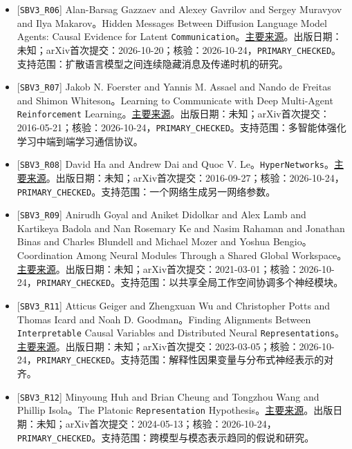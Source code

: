 \documentclass[
  10pt,
]{article}
\begin{document}
\begin{itemize}
\item
  {[}\nolinkurl{SBV3_R06}{]} Alan-Barsag Gazzaev and Alexey Gavrilov and
  Sergey Muravyov and Ilya Makarov。Hidden Messages Between Diffusion
  Language Model Agents: Causal Evidence for Latent
  \nolinkurl{Communication}。\href{https://arxiv.org/abs/2610.28905}{主要来源}。出版日期：未知；arXiv首次提交：2026-10-20；核验：2026-10-24，\nolinkurl{PRIMARY_CHECKED}。支持范围：扩散语言模型之间连续隐藏消息及传递时机的研究。
\item
  {[}\nolinkurl{SBV3_R07}{]} Jakob N. Foerster and Yannis M. Assael and
  Nando de Freitas and Shimon Whiteson。Learning to Communicate with
  Deep Multi-Agent \nolinkurl{Reinforcement}
  Learning。\href{https://arxiv.org/abs/1605.06676}{主要来源}。出版日期：未知；arXiv首次提交：2016-05-21；核验：2026-10-24，\nolinkurl{PRIMARY_CHECKED}。支持范围：多智能体强化学习中端到端学习通信协议。
\item
  {[}\nolinkurl{SBV3_R08}{]} David Ha and Andrew Dai and Quoc V.
  Le。\nolinkurl{HyperNetworks}。\href{https://arxiv.org/abs/1609.09106}{主要来源}。出版日期：未知；arXiv首次提交：2016-09-27；核验：2026-10-24，\nolinkurl{PRIMARY_CHECKED}。支持范围：一个网络生成另一网络参数。
\item
  {[}\nolinkurl{SBV3_R09}{]} Anirudh Goyal and Aniket Didolkar and Alex
  Lamb and Kartikeya Badola and Nan Rosemary Ke and Nasim Rahaman and
  Jonathan Binas and Charles Blundell and Michael Mozer and Yoshua
  Bengio。Coordination Among Neural Modules Through a Shared Global
  Workspace。\href{https://arxiv.org/abs/2103.01197}{主要来源}。出版日期：未知；arXiv首次提交：2021-03-01；核验：2026-10-24，\nolinkurl{PRIMARY_CHECKED}。支持范围：以共享全局工作空间协调多个神经模块。
\item
  {[}\nolinkurl{SBV3_R11}{]} Atticus Geiger and Zhengxuan Wu and
  Christopher Potts and Thomas Icard and Noah D. Goodman。Finding
  Alignments Between \nolinkurl{Interpretable} Causal Variables and
  Distributed Neural
  \nolinkurl{Representations}。\href{https://arxiv.org/abs/2303.02536}{主要来源}。出版日期：未知；arXiv首次提交：2023-03-05；核验：2026-10-24，\nolinkurl{PRIMARY_CHECKED}。支持范围：解释性因果变量与分布式神经表示的对齐。
\item
  {[}\nolinkurl{SBV3_R12}{]} Minyoung Huh and Brian Cheung and Tongzhou
  Wang and Phillip Isola。The Platonic \nolinkurl{Representation}
  Hypothesis。\href{https://arxiv.org/abs/2405.07987}{主要来源}。出版日期：未知；arXiv首次提交：2024-05-13；核验：2026-10-24，\nolinkurl{PRIMARY_CHECKED}。支持范围：跨模型与模态表示趋同的假说和研究。

\end{itemize}
\end{document}
